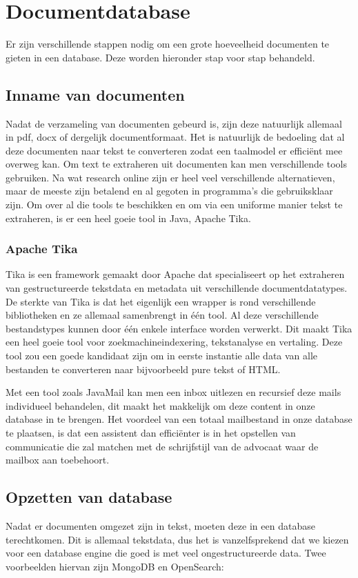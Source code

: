 \chapter{Documentdatabase}
Er zijn verschillende stappen nodig om een grote hoeveelheid documenten te gieten in een database.
Deze worden hieronder stap voor stap behandeld.

\section{Inname van documenten}
Nadat de verzameling van documenten gebeurd is, zijn deze natuurlijk allemaal in pdf, docx of dergelijk documentformaat.
Het is natuurlijk de bedoeling dat al deze documenten naar tekst te converteren zodat een taalmodel er efficiënt mee overweg kan.
Om text te extraheren uit documenten kan men verschillende tools gebruiken.
Na wat research online zijn er heel veel verschillende alternatieven, maar de meeste zijn betalend en al gegoten in programma's die gebruiksklaar zijn.
Om over al die tools te beschikken en om via een uniforme manier tekst te extraheren, is er een heel goeie tool in Java, Apache Tika.

\subsection{Apache Tika}
Tika is een framework gemaakt door Apache dat specialiseert op het extraheren van gestructureerde tekstdata en metadata uit verschillende documentdatatypes.
De sterkte van Tika is dat het eigenlijk een wrapper is rond verschillende bibliotheken en ze allemaal samenbrengt in één tool.
Al deze verschillende bestandstypes kunnen door één enkele interface worden verwerkt.
Dit maakt Tika een heel goeie tool voor zoekmachineindexering, tekstanalyse en vertaling.
Deze tool zou een goede kandidaat zijn om in eerste instantie alle data van alle bestanden te converteren naar bijvoorbeeld pure tekst of HTML.

Met een tool zoals JavaMail kan men een inbox uitlezen en recursief deze mails individueel behandelen, dit maakt het makkelijk om deze content in onze database in te brengen.
Het voordeel van een totaal mailbestand in onze database te plaatsen,
is dat een assistent dan efficiënter is in het opstellen van communicatie die zal matchen met de schrijfstijl van de advocaat waar de mailbox aan toebehoort.

\section{Opzetten van database}
Nadat er documenten omgezet zijn in tekst, moeten deze in een database terechtkomen.
Dit is allemaal tekstdata, dus het is vanzelfsprekend dat we kiezen voor een database engine die goed is met veel ongestructureerde data.
Twee voorbeelden hiervan zijn MongoDB en OpenSearch:

